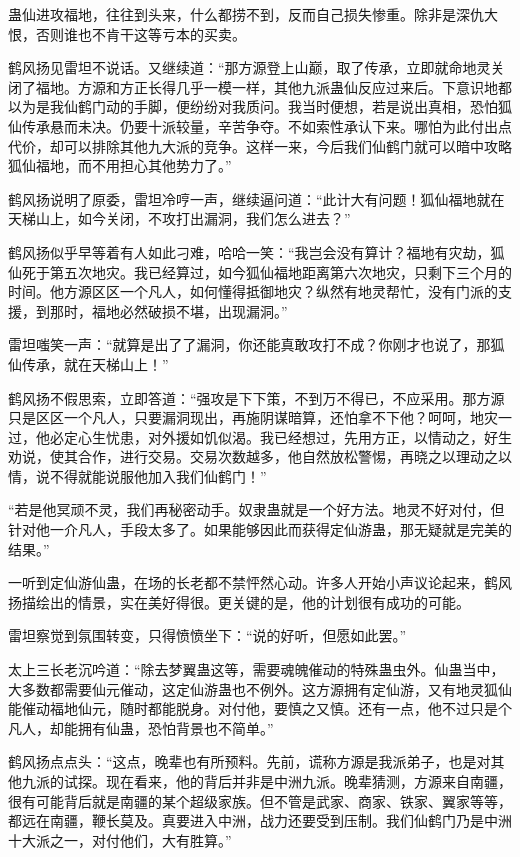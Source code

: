 \begin{this_body}
蛊仙进攻福地，往往到头来，什么都捞不到，反而自己损失惨重。除非是深仇大恨，否则谁也不肯干这等亏本的买卖。

鹤风扬见雷坦不说话。又继续道：“那方源登上山巅，取了传承，立即就命地灵关闭了福地。方源和方正长得几乎一模一样，其他九派蛊仙反应过来后。下意识地都以为是我仙鹤门动的手脚，便纷纷对我质问。我当时便想，若是说出真相，恐怕狐仙传承悬而未决。仍要十派较量，辛苦争夺。不如索性承认下来。哪怕为此付出点代价，却可以排除其他九大派的竞争。这样一来，今后我们仙鹤门就可以暗中攻略狐仙福地，而不用担心其他势力了。”

鹤风扬说明了原委，雷坦冷哼一声，继续逼问道：“此计大有问题！狐仙福地就在天梯山上，如今关闭，不攻打出漏洞，我们怎么进去？”

鹤风扬似乎早等着有人如此刁难，哈哈一笑：“我岂会没有算计？福地有灾劫，狐仙死于第五次地灾。我已经算过，如今狐仙福地距离第六次地灾，只剩下三个月的时间。他方源区区一个凡人，如何懂得抵御地灾？纵然有地灵帮忙，没有门派的支援，到那时，福地必然破损不堪，出现漏洞。”

雷坦嗤笑一声：“就算是出了了漏洞，你还能真敢攻打不成？你刚才也说了，那狐仙传承，就在天梯山上！”

鹤风扬不假思索，立即答道：“强攻是下下策，不到万不得已，不应采用。那方源只是区区一个凡人，只要漏洞现出，再施阴谋暗算，还怕拿不下他？呵呵，地灾一过，他必定心生忧患，对外援如饥似渴。我已经想过，先用方正，以情动之，好生劝说，使其合作，进行交易。交易次数越多，他自然放松警惕，再晓之以理动之以情，说不得就能说服他加入我们仙鹤门！”

“若是他冥顽不灵，我们再秘密动手。奴隶蛊就是一个好方法。地灵不好对付，但针对他一介凡人，手段太多了。如果能够因此而获得定仙游蛊，那无疑就是完美的结果。”

一听到定仙游仙蛊，在场的长老都不禁怦然心动。许多人开始小声议论起来，鹤风扬描绘出的情景，实在美好得很。更关键的是，他的计划很有成功的可能。

雷坦察觉到氛围转变，只得愤愤坐下：“说的好听，但愿如此罢。”

太上三长老沉吟道：“除去梦翼蛊这等，需要魂魄催动的特殊蛊虫外。仙蛊当中，大多数都需要仙元催动，这定仙游蛊也不例外。这方源拥有定仙游，又有地灵狐仙能催动福地仙元，随时都能脱身。对付他，要慎之又慎。还有一点，他不过只是个凡人，却能拥有仙蛊，恐怕背景也不简单。”

鹤风扬点点头：“这点，晚辈也有所预料。先前，谎称方源是我派弟子，也是对其他九派的试探。现在看来，他的背后并非是中洲九派。晚辈猜测，方源来自南疆，很有可能背后就是南疆的某个超级家族。但不管是武家、商家、铁家、翼家等等，都远在南疆，鞭长莫及。真要进入中洲，战力还要受到压制。我们仙鹤门乃是中洲十大派之一，对付他们，大有胜算。”


\end{this_body}

